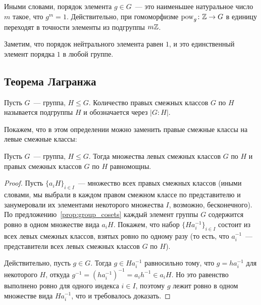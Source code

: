 Иными словами, порядок элемента $g\in G$~--- это наименьшее
натуральное число $m$ такое, что $g^m=1$. Действительно, при
гомоморфизме $\operatorname{pow}_g\colon\mathbb Z\to G$ в единицу переходят в точности
элементы из подгруппы $m\mathbb Z$.

\begin{remark}\label{rem:order_of_neutral_element}
Заметим, что порядок нейтрального элемента равен $1$, и это
единственный элемент порядка $1$ в любой группе.
\end{remark}


\subsection{Теорема Лагранжа}


\begin{definition}
Пусть $G$~--- группа, $H\leq G$. Количество правых смежных классов $G$
по $H$ называется  подгруппы $H$
и обозначается через $|G:H|$.
\end{definition}

Покажем, что в этом определении можно заменить правые смежные классы
на левые смежные классы:

\begin{lemma}
Пусть $G$~--- группа, $H\leq G$. Тогда множества левых смежных классов
$G$ по $H$ и правых смежных классов $G$ по $H$ равномощны.
\end{lemma}
\begin{proof}
Пусть $\{a_iH\}_{i\in I}$~--- множество всех правых смежных классов
(иными словами, мы выбрали в каждом правом смежном классе по
представителю и занумеровали их элементами некоторого множества $I$,
возможно, бесконечного). 
По предложению~\ref{prop:group_cosets} каждый элемент группы $G$
содержится ровно в одном множестве вида $a_iH$. Покажем, что
набор $\{Ha_i^{-1}\}_{i\in I}$ состоит из всех левых смежных классов,
взятых ровно по одному разу (то есть, что $a_i^{-1}$~--- представители
всех левых смежных классов $G$ по $H$).

Действительно, пусть $g\in G$. Тогда $g\in Ha_i^{-1}$ равносильно тому, что
$g=ha_i^{-1}$ для некоторого $H$, откуда $g^{-1} = (ha_i^{-1})^{-1} =
a_ih^{-1}\in a_iH$. Но это равенство выполнено ровно для одного
индекса $i\in I$, поэтому $g$ лежит ровно в одном множестве вида
$Ha_i^{-1}$, что и требовалось доказать.
\end{proof}

